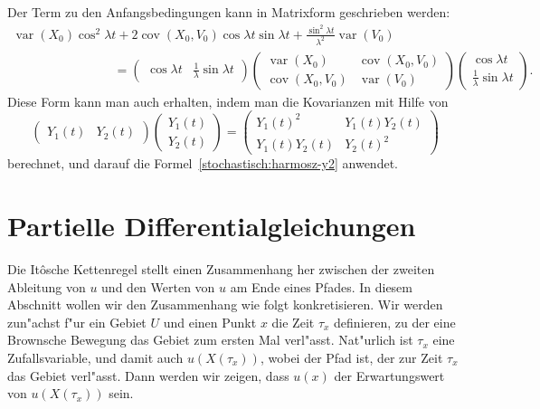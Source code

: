 Der Term zu den Anfangsbedingungen kann in Matrixform geschrieben
werden:
\begin{gather*}
\operatorname{var}(X_0)\cos^2\lambda t
+2\operatorname{cov}(X_0,V_0)\cos\lambda t\sin\lambda t
+
\frac{\sin^2\lambda t}{\lambda^2}\operatorname{var}(V_0)
\qquad
\qquad
\qquad
\qquad
\\
\qquad
\qquad
\qquad
\qquad
=
\begin{pmatrix}
\cos\lambda t&\frac1\lambda\sin\lambda t
\end{pmatrix}
\begin{pmatrix}
\operatorname{var}(X_0)    &\operatorname{cov}(X_0,V_0)\\
\operatorname{cov}(X_0,V_0)&\operatorname{var}(V_0)
\end{pmatrix}
\begin{pmatrix}
\cos\lambda t\\
\frac1\lambda\sin\lambda t
\end{pmatrix}.
\end{gather*}
Diese Form kann man auch erhalten, indem man die Kovarianzen mit Hilfe von
\[
\begin{pmatrix} Y_1(t)&Y_2(t) \end{pmatrix}
\begin{pmatrix}
Y_1(t)\\
Y_2(t)
\end{pmatrix}
=
\begin{pmatrix}
Y_1(t)^2&Y_1(t)Y_2(t)\\
Y_1(t)Y_2(t)&Y_2(t)^2
\end{pmatrix}
\]
berechnet, und darauf die Formel~\eqref{stochastisch:harmosz-y2} anwendet.

%
%
\section{Partielle Differentialgleichungen\label{section:pdgl}}
%
Die It\^osche Kettenregel stellt einen Zusammenhang her zwischen der zweiten
Ableitung von $u$ und den Werten von $u$ am Ende eines Pfades.
In diesem Abschnitt wollen wir den Zusammenhang wie folgt konkretisieren.
Wir werden zun"achst f"ur ein Gebiet $U$ und einen Punkt $x$ die
Zeit $\tau_x$ definieren, zu der eine Brownsche Bewegung das Gebiet zum
ersten Mal verl"asst.
Nat"urlich ist $\tau_x$ eine Zufallsvariable, und damit auch $u(X(\tau_x))$,
wobei der Pfad ist, der zur Zeit $\tau_x$ das Gebiet verl"asst.
Dann werden wir zeigen, dass $u(x)$ der Erwartungswert von $u(X(\tau_x))$
sein.

